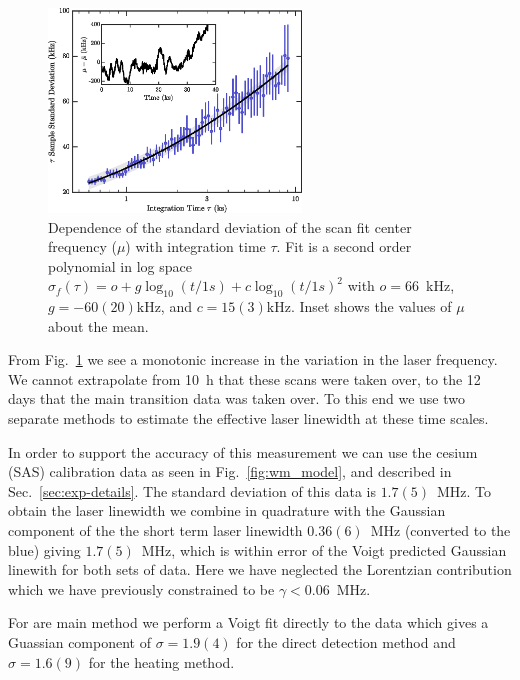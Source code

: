 \documentclass[%
 amsmath,amssymb,
aps,
]{revtex4-2}
\begin{document}
\begin{figure}
    \centering
    \includegraphics[width=0.6\textwidth]{SOMs/tau_sample_std_inset}
    \caption{Dependence of the standard deviation of the scan fit center frequency ($\mu$) with integration time $\tau$. Fit is a second order polynomial in log space $\sigma_f(\tau)=o+g\log_{10}{(t/1s)}+c\log_{10}{(t/1s)}^2$ with $o=66$~kHz, $g=-60(20) \mathrm{kHz}$, and $c=15(3) \mathrm{kHz}$. Inset shows the values of $\mu$ about the mean.}
    \label{fig:2p_tau_sd_dep}
\end{figure}

From Fig.~\ref{fig:2p_tau_sd_dep} we see a monotonic increase in the variation in the laser frequency. We cannot extrapolate from 10~h that these scans were taken over, to the 12 days that the main transition data was taken over. To this end we use two separate methods to estimate the effective laser linewidth at these time scales. 

In order to support the accuracy of this measurement we can use the cesium (SAS) calibration data as seen in Fig.~\ref{fig:wm_model}, and described in Sec.~\ref{sec:exp-details}. The standard deviation of this data is \(1.7(5)\)~MHz. To obtain the laser linewidth we combine in quadrature with the Gaussian component of the the short term laser linewidth \(0.36(6)\)~MHz (converted to the blue) giving \(1.7(5)\)~MHz, which is within error of the Voigt predicted Gaussian linewith for both sets of data. Here we have neglected the Lorentzian contribution which we have previously constrained to be $\gamma<0.06$~MHz.

For are main method we perform a Voigt fit directly to the data which gives a Guassian component of \(\sigma=1.9(4)\) for the direct detection method and \(\sigma=1.6(9)\) for the heating method.

\end{document}
